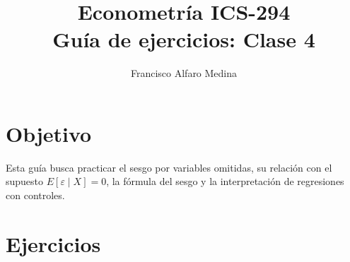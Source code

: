 \documentclass[11pt]{article}
\title{Econometría ICS-294\\Guía de ejercicios: Clase 4}
\author{Francisco Alfaro Medina}
\date{}
\begin{document}
\maketitle

\section*{Objetivo}

Esta guía busca practicar el sesgo por variables omitidas, su relación con el supuesto $E[\varepsilon\mid X]=0$, la fórmula del sesgo y la interpretación de regresiones con controles.

\section*{Ejercicios}
\end{document}
